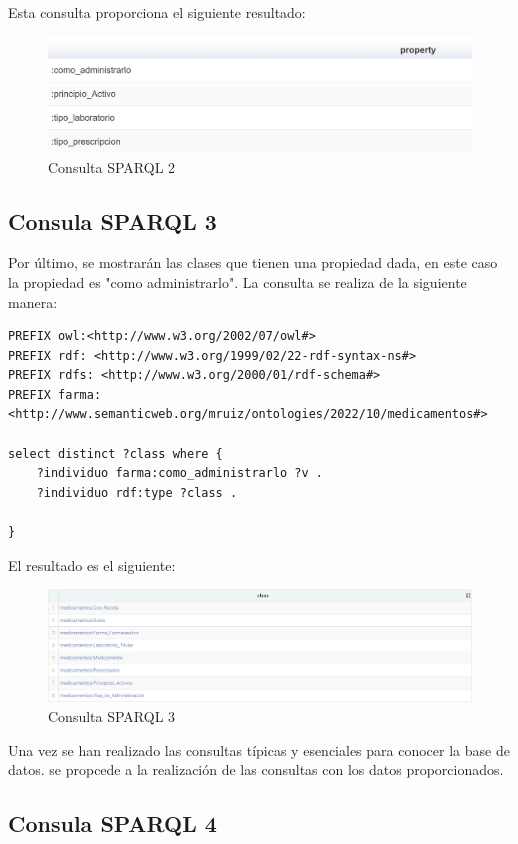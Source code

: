 \documentclass[../main.tex]{subfiles}
\begin{document}
Esta consulta proporciona el siguiente resultado:
\begin{figure}[h]
    \centering
    \includegraphics[scale=0.2]{images/propiedades-sparql.png}
    \caption{Consulta SPARQL 2}
    \label{fig:mesh1}
\end{figure}

\subsection{Consula SPARQL 3}
Por último, se mostrarán las clases que tienen una propiedad dada, en este caso la propiedad es "como administrarlo".
La consulta se realiza de la siguiente manera:
\begin{lstlisting}
PREFIX owl:<http://www.w3.org/2002/07/owl#>
PREFIX rdf: <http://www.w3.org/1999/02/22-rdf-syntax-ns#>
PREFIX rdfs: <http://www.w3.org/2000/01/rdf-schema#>
PREFIX farma: <http://www.semanticweb.org/mruiz/ontologies/2022/10/medicamentos#>

select distinct ?class where { 
    ?individuo farma:como_administrarlo ?v . 
    ?individuo rdf:type ?class . 
    
} 
\end{lstlisting}

El resultado es el siguiente:
\begin{figure}[h]
    \centering
    \includegraphics[scale=0.2]{images/comoAdministrarlo.png}
    \caption{Consulta SPARQL 3}
    \label{fig:mesh1}
\end{figure}


Una vez se han realizado las consultas típicas y esenciales para conocer la base de datos. se propcede a la realización de las consultas con los datos proporcionados.

\subsection{Consula SPARQL 4}
\end{document}
